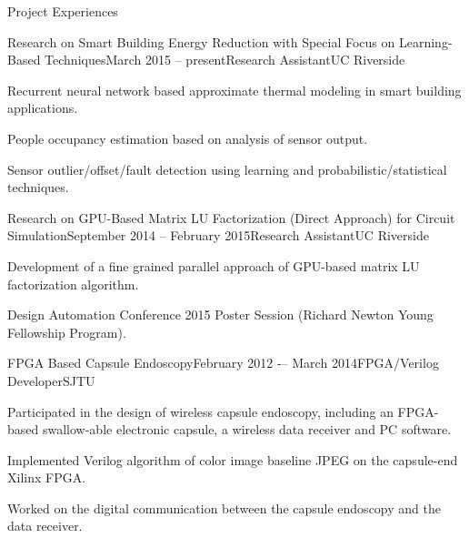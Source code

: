 \documentclass{resume} %
\begin{document}
\begin{rSection}{Project Experiences}


    \begin{rSubsection}{Research on Smart Building Energy Reduction with Special Focus on Learning-Based Techniques}{March 2015 -- present}{Research Assistant}{UC Riverside}

    \item Recurrent neural network based approximate thermal modeling in smart
        building applications.

    \item People occupancy estimation based on analysis of sensor output.

    \item Sensor outlier/offset/fault detection using learning and
        probabilistic/statistical techniques.

    \end{rSubsection}

    \begin{rSubsection}{Research on GPU-Based Matrix LU Factorization (Direct Approach) for Circuit Simulation}{September 2014 -- February 2015}{Research Assistant}{UC Riverside}

    \item Development of a fine grained parallel approach of GPU-based matrix
        LU factorization algorithm.

    \item Design Automation Conference 2015 Poster Session (Richard Newton
        Young Fellowship Program).

    \end{rSubsection}


    \begin{rSubsection}{FPGA Based Capsule Endoscopy}{February 2012 -– March 2014}{FPGA/Verilog Developer}{SJTU}

    \item Participated in the design of wireless capsule endoscopy, including an
        FPGA-based swallow-able electronic capsule, a wireless data receiver and PC
        software.

    \item Implemented Verilog algorithm of color image baseline JPEG on the
        capsule-end Xilinx FPGA.

    \item Worked on the digital communication between the capsule endoscopy and
        the data receiver.


\end{rSubsection}
\end{rSection}
\end{document}
